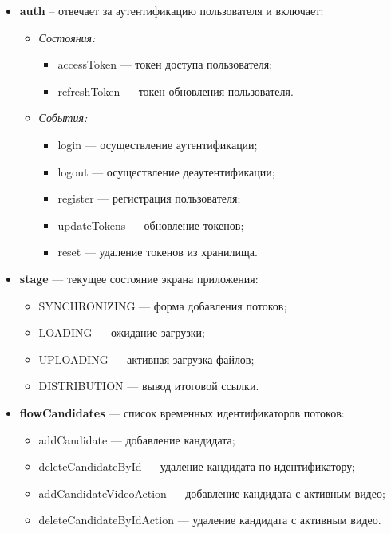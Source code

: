 	\begin{itemize}[label=$\bullet$]
		\item \textbf{auth} – отвечает за аутентификацию пользователя и включает:
		\begin{itemize}[label=$\circ$]
			\item \textit{Состояния:}
			\begin{itemize}[label=--]
				\item accessToken — токен доступа пользователя;
				\item refreshToken — токен обновления пользователя.
			\end{itemize}
			\item \textit{События:}
			\begin{itemize}[label=--]
				\item login — осуществление аутентификации;
				\item logout — осуществление деаутентификации;
				\item register — регистрация пользователя;
				\item updateTokens — обновление токенов;
				\item reset — удаление токенов из хранилища.
			\end{itemize}
		\end{itemize}
		
		\item \textbf{stage} — текущее состояние экрана приложения:
		\begin{itemize}[label=$\circ$]
			\item SYNCHRONIZING — форма добавления потоков;
			\item LOADING — ожидание загрузки;
			\item UPLOADING — активная загрузка файлов;
			\item DISTRIBUTION — вывод итоговой ссылки.
		\end{itemize}
		
		\item \textbf{flowCandidates} — список временных идентификаторов потоков:
		\begin{itemize}[label=$\circ$]
			\item addCandidate — добавление кандидата;
			\item deleteCandidateById — удаление кандидата по идентификатору;
			\item addCandidateVideoAction — добавление кандидата с активным видео;
			\item deleteCandidateByIdAction — удаление кандидата с активным видео.
		\end{itemize}
		

\end{itemize}
